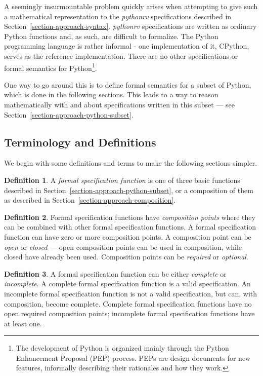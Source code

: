 \documentclass[a4paper,11pt]{kth-mag}
\theoremstyle{definition}
\newtheorem{mydef}{Definition}
\begin{document}
A seemingly insurmountable problem quickly arises when attempting to give such
a mathematical representation to the \textit{pythonrv} specifications described
in Section~\ref{section-approach-syntax}. \textit{pythonrv} specifications are
written as ordinary Python functions and, as such, are difficult to formalize.
The Python programming language is rather informal - one implementation of it,
CPython, serves as the reference implementation. There are no other
specifications or formal semantics for Python\footnote{The development of
  Python is organized mainly through the Python Enhancement Proposal (PEP)
  process. PEPs are design documents for new features, informally describing
their rationales and how they work.}.

One way to go around this is to define formal semantics for a subset of Python,
which is done in the following sections. This leads to a way to reason
mathematically with and about specifications written in this subset --- see
Section~\ref{section-approach-python-subset}.


\subsection{Terminology and Definitions}

We begin with some definitions and terms to make the following sections
simpler.

\begin{mydef}\label{def-}
A \textit{formal specification function} is one of three basic functions
described in Section~\ref{section-approach-python-subset}, or a composition of
them as described in Section~\ref{section-approach-composition}.
\end{mydef}

\begin{mydef}\label{def-}
Formal specification functions have \textit{composition points} where they can
be combined with other formal specification functions. A formal specification
function can have zero or more composition points. A composition point can be
\textit{open} or \textit{closed} --- open composition points can be used in
composition, while closed have already been used. Composition points can be
\textit{required} or
\textit{optional}.
\end{mydef}

\begin{mydef}\label{def-}
A formal specification function can be either \textit{complete} or
\textit{incomplete}. A complete formal specification function is a valid
specification. An incomplete formal specification function is not a valid
specification, but can, with composition, become complete. Complete formal
specification functions have no open required composition points; incomplete
formal specification functions have at least one.
\end{mydef}
\end{document}
